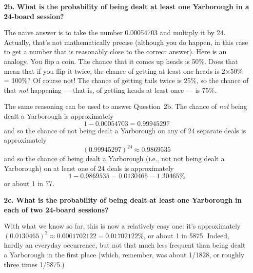 \documentclass{amsart}
\numberwithin{equation}{section}
\newcommand{\x}{\times}
\begin{document}
\textbf{2b. What is the probability of being dealt at least one Yarborough in a 24-board session?}

The naive answer is to take the number 0.00054703 and multiply it by 24.  Actually, that's not mathematically
precise (although you do happen, in this case to get a number that is reasonably close
to the correct answer).  Here is an analogy.  You flip a coin.  The chance that it comes up heads is 50\%.  Does
that mean that if you flip it twice, the chance of getting at least one heads is 2$\x$50\% = 100\%?  Of course
not!  The chance of getting tails twice is 25\%, so the chance of that \emph{not} happening --- that is,
of getting heads at least once --- is 75\%.  

The same reasoning can be used to answer Question~2b.  The chance of \emph{not} being dealt a Yarborough is
approximately
$$1 - 0.00054703 = 0.99945297$$
and so the chance of not being dealt a Yarborough on any of 24 separate deals is approximately
$$(0.99945297)^{24} \approx 0.9869535$$
and so the chance of being dealt a Yarborough (i.e., not not being dealt a Yarborough) on at least one of 24 deals is approximately
$$1-0.9869535=0.0130465=1.30465\%$$
or about 1 in 77.

\textbf{2c. What is the probability of being dealt at least one Yarborough in each of two 24-board sessions?}

With what we know so far, this is now a relatively easy one: it's approximately $(0.0130465)^2\approx
0.0001702122=0.01702122\%$, or about 1 in 5875.  Indeed, hardly an everyday occurrence, but
not that much less frequent than being dealt a Yarborough in the first place (which, remember, was about
1/1828, or roughly three times 1/5875.)

\pagebreak
\end{document}
